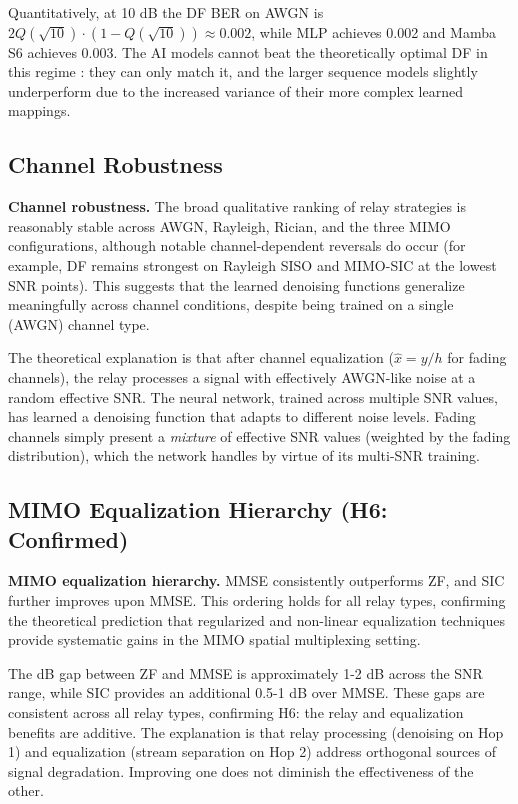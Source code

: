 Quantitatively, at 10 dB the DF BER on AWGN is \(2Q(\sqrt{10}) \cdot (1 - Q(\sqrt{10})) \approx 0.002\), while MLP achieves 0.002 and Mamba S6 achieves 0.003. The AI models cannot beat the theoretically optimal DF in this regime : they can only match it, and the larger sequence models slightly underperform due to the increased variance of their more complex learned mappings.

\subsection{Channel Robustness}\label{sec:channel-robustness}

\textbf{Channel robustness.} The broad qualitative ranking of relay strategies is reasonably stable across AWGN, Rayleigh, Rician, and the three MIMO configurations, although notable channel-dependent reversals do occur (for example, DF remains strongest on Rayleigh SISO and MIMO-SIC at the lowest SNR points). This suggests that the learned denoising functions generalize meaningfully across channel conditions, despite being trained on a single (AWGN) channel type.

The theoretical explanation is that after channel equalization (\(\hat{x} = y/h\) for fading channels), the relay processes a signal with effectively AWGN-like noise at a random effective SNR. The neural network, trained across multiple SNR values, has learned a denoising function that adapts to different noise levels. Fading channels simply present a \emph{mixture} of effective SNR values (weighted by the fading distribution), which the network handles by virtue of its multi-SNR training.

\subsection{MIMO Equalization Hierarchy (H6: Confirmed)}\label{sec:mimo-equalization-hierarchy-h6-confirmed}

\textbf{MIMO equalization hierarchy.} MMSE consistently outperforms ZF, and SIC further improves upon MMSE. This ordering holds for all relay types, confirming the theoretical prediction that regularized and non-linear equalization techniques provide systematic gains in the MIMO spatial multiplexing setting.

The dB gap between ZF and MMSE is approximately 1-2 dB across the SNR range, while SIC provides an additional 0.5-1 dB over MMSE. These gaps are consistent across all relay types, confirming H6: the relay and equalization benefits are additive. The explanation is that relay processing (denoising on Hop 1) and equalization (stream separation on Hop 2) address orthogonal sources of signal degradation. Improving one does not diminish the effectiveness of the other.

